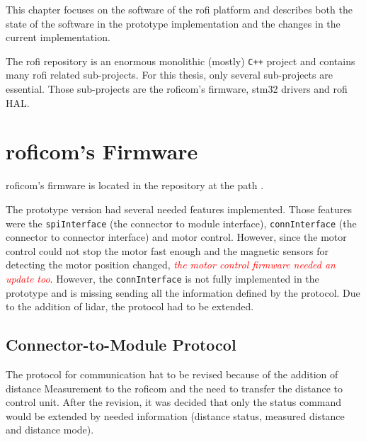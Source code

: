 \documentclass[
  digital,     %
  oneside,     %
  nosansbold,  %
  nocolorbold, %
  nolof,         %
  nolot,         %
]{fithesis4}
\newcommand{\TODO}[1]{\textcolor{red}{\textit{#1}}}
\begin{document}
{{{This chapter focuses on the software of the \acrshort{rofi} platform and describes both the state of the software in the prototype implementation and the changes in the current implementation.

The \acrshort{rofi} repository is an enormous monolithic (mostly) \verb|C++| project and contains many \acrshort{rofi} related sub-projects. For this thesis, only several sub-projects are essential. Those sub-projects are the \acrshort{roficom}'s firmware, stm32 drivers and \acrshort{rofi} HAL.


\section[ RoFICoM's Firmware ]{ \acrshort{roficom}'s Firmware } \label{sec:roficom-firmware}
\acrshort{roficom}'s firmware is located in the repository at the path .

The prototype version had several needed features implemented. Those features were the \lstinline|spiInterface| (the connector to module interface), \lstinline|connInterface| (the connector to connector interface) and motor control. However, since the motor control could not stop the motor fast enough and the magnetic sensors for detecting the motor position changed, \TODO{the motor control firmware needed an update too}. However, the \lstinline|connInterface| is not fully implemented in the prototype and is missing sending all the information defined by the protocol. Due to the addition of lidar, the protocol had to be extended.

\subsection{ Connector-to-Module Protocol }

The protocol for communication hat to be revised because of the addition of distance Measurement to the \acrshort{roficom} and the need to transfer the distance to control unit. After the revision, it was decided that only the status command would be extended by needed information (distance status, measured distance and distance mode).

}}}
\end{document}
